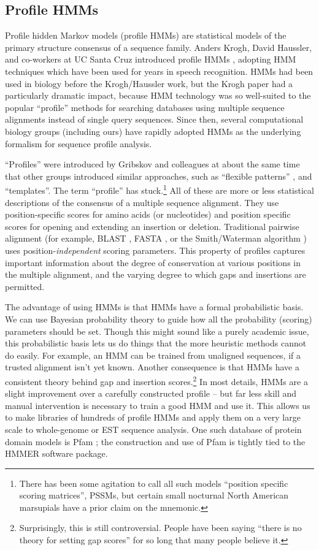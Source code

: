 \subsection {Profile HMMs}

Profile hidden Markov models (profile HMMs) are statistical models of
the primary structure consensus of a sequence family. Anders Krogh,
David Haussler, and co-workers at UC Santa Cruz introduced profile
HMMs \cite{Krogh94}, adopting HMM techniques which have been used for
years in speech recognition. HMMs had been used in biology before the
Krogh/Haussler work, but the Krogh paper had a particularly dramatic
impact, because HMM technology was so well-suited to the popular
``profile'' methods for searching databases using multiple sequence
alignments instead of single query sequences. Since then, several
computational biology groups (including ours) have rapidly adopted
HMMs as the underlying formalism for sequence profile analysis.

``Profiles'' were introduced by Gribskov and colleagues
\cite{Gribskov87,Gribskov90} at about the same time
that other groups introduced similar approaches, such as ``flexible
patterns'' \cite{Barton90}, and
``templates''\cite{Bashford87,Taylor86}. The term ``profile'' has
stuck.\footnote{There has been some agitation to call all such models
``position specific scoring matrices'', PSSMs, but certain small
nocturnal North American marsupials have a prior claim on the
mnemonic.}  All of these are more or less statistical descriptions of
the consensus of a multiple sequence alignment. They use
position-specific scores for amino acids (or nucleotides) and position
specific scores for opening and extending an insertion or deletion.
Traditional pairwise alignment (for example, BLAST
\cite{Altschul90}, FASTA \cite{Pearson88}, or the Smith/Waterman
algorithm \cite{Smith81}) uses position-{\em independent} scoring
parameters. This property of profiles captures important information
about the degree of conservation at various positions in the multiple
alignment, and the varying degree to which gaps and insertions are
permitted.

The advantage of using HMMs is that HMMs have a formal probabilistic
basis. We can use Bayesian probability theory to guide how all the
probability (scoring) parameters should be set. Though this might
sound like a purely academic issue, this probabilistic basis lets us
do things that the more heuristic methods cannot do easily. For
example, an HMM can be trained from unaligned sequences, if a trusted
alignment isn't yet known. Another consequence is that HMMs have a
consistent theory behind gap and insertion scores.\footnote{
Surprisingly, this is still controversial.  People have been saying
``there is no theory for setting gap scores'' for so long that many
people believe it.} In most details, HMMs are a slight improvement
over a carefully constructed profile -- but far less skill and manual
intervention is necessary to train a good HMM and use it.  This allows
us to make libraries of hundreds of profile HMMs and apply them on a
very large scale to whole-genome or EST sequence analysis.  One such
database of protein domain models is Pfam \cite{Sonnhammer97}; the
construction and use of Pfam is tightly tied to the HMMER software
package.

